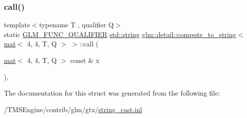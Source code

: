 \subsubsection{\texorpdfstring{call()}{call()}}
{\footnotesize\ttfamily template$<$typename T , qualifier Q$>$ \\
static \hyperlink{setup_8hpp_a33fdea6f91c5f834105f7415e2a64407}{G\+L\+M\+\_\+\+F\+U\+N\+C\+\_\+\+Q\+U\+A\+L\+I\+F\+I\+ER} \hyperlink{_s_d_l__opengl__glext_8h_ae84541b4f3d8e1ea24ec0f466a8c568b}{std\+::string} \hyperlink{structglm_1_1detail_1_1compute__to__string}{glm\+::detail\+::compute\+\_\+to\+\_\+string}$<$ \hyperlink{structglm_1_1mat}{mat}$<$ 4, 4, T, Q $>$ $>$\+::call (\begin{DoxyParamCaption}\item[{\hyperlink{structglm_1_1mat}{mat}$<$ 4, 4, T, Q $>$ const \&}]{x }\end{DoxyParamCaption})\hspace{0.3cm}{\ttfamily [inline]}, {\ttfamily [static]}}



The documentation for this struct was generated from the following file\+:\begin{DoxyCompactItemize}
\item 
/\+T\+M\+S\+Engine/contrib/glm/gtx/\hyperlink{string__cast_8inl}{string\+\_\+cast.\+inl}\end{DoxyCompactItemize}
